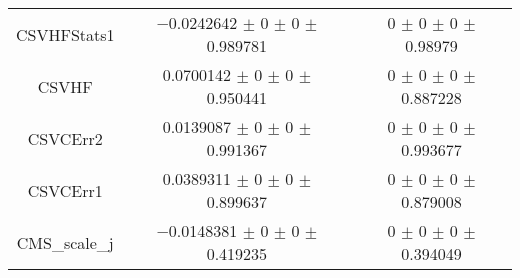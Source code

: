 \begin{table}
\begin{tabular}{ccc}
CSVHFStats1 	& \num{-0.0242642} $\pm$ \num{0} $\pm$ \num{0} $\pm$ \num{0.989781} 	& \num{0} $\pm$ \num{0} $\pm$ \num{0} $\pm$ \num{0.98979}\\
CSVHF 	& \num{0.0700142} $\pm$ \num{0} $\pm$ \num{0} $\pm$ \num{0.950441} 	& \num{0} $\pm$ \num{0} $\pm$ \num{0} $\pm$ \num{0.887228}\\
CSVCErr2 	& \num{0.0139087} $\pm$ \num{0} $\pm$ \num{0} $\pm$ \num{0.991367} 	& \num{0} $\pm$ \num{0} $\pm$ \num{0} $\pm$ \num{0.993677}\\
CSVCErr1 	& \num{0.0389311} $\pm$ \num{0} $\pm$ \num{0} $\pm$ \num{0.899637} 	& \num{0} $\pm$ \num{0} $\pm$ \num{0} $\pm$ \num{0.879008}\\
CMS\_scale\_j 	& \num{-0.0148381} $\pm$ \num{0} $\pm$ \num{0} $\pm$ \num{0.419235} 	& \num{0} $\pm$ \num{0} $\pm$ \num{0} $\pm$ \num{0.394049}\\
\bottomrule
\end{tabular}
\end{table}